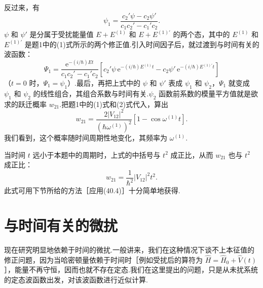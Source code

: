\begin{xiti}
反过来，有
\begin{equation*}
  \psi_1=\frac{c_2'\psi-c_2\psi'}{c_1c_2'-c_1'c_2}.
\end{equation*}
$\psi$ 和 $\psi'$ 是分属于受扰能量值 $E+E^{(1)}$ 和 $E+E^{(1)'}$ 的两个态，其中的 $E^{(1)}$ 和 $E^{(1)'}$ 是题1中的(1)式所示的两个修正值.引入时间因子后，就过渡到与时间有关的波函数：
\begin{equation*}
  \varPsi_1=\frac{\mathrm{e}^{-(i/\hbar)Et}}{c_1c_2'-c_1'c_2}
  \left[c_2'\psi\,\mathrm{e}^{-(i/\hbar)E^{(1)}t}
  -c_2\psi'\,\mathrm{e}^{-(i/\hbar)E^{(1)'}t}\right]
\end{equation*}
（$t=0$ 时，$\varPsi_1=\psi_1$）.最后，再把上式中的 $\psi$ 和 $\psi'$ 表成 $\psi_1$ 和 $\psi_2$，$\varPsi_1$ 就变成 $\psi_1$ 和 $\psi_2$ 的线性组合，其组合系数与时间有关.$\psi_2$ 函数前系数的模量平方值就是欲求的跃迁概率 $w_{21}$.把题1中的(1)式和(2)式代入，算出
\begin{equation*}
  w_{21}=\frac{2|V_{12}|^2}{\left(\hbar\omega^{(1)}\right)^2}
  \left[1-\cos\omega^{(1)}t\right].
\end{equation*}
我们看到，这个概率随时间周期性地变化，其频率为 $\omega^{(1)}$.

当时间 $t$ 远小于本题中的周期时，上式的中括号与 $t^2$ 成正比，从而 $w_{21}$ 也与 $t^2$ 成正比：
\begin{equation*}
  w_{21}=\frac{1}{\hbar^2}|V_{12}|^2t^2.
\end{equation*}
此式可用下节所给的方法［应用(40.4)］十分简单地获得.

\end{xiti}
\renewcommand{\theequation}{\arabic{section}.\arabic{equation}}%

\section{与时间有关的微扰}

现在研究明显地依赖于时间的微扰.一般讲来，我们在这种情况下谈不上本征值的修正问题，因为当哈密顿量依赖于时间时［例如受扰后的算符为 $\hat{H}=\hat{H}_0+\hat{V}(t)$］，能量不再守恒，因而也就不存在定态.我们在这里提出的问题，只是从未扰系统的定态波函数出发，对该波函数进行近似计算.

